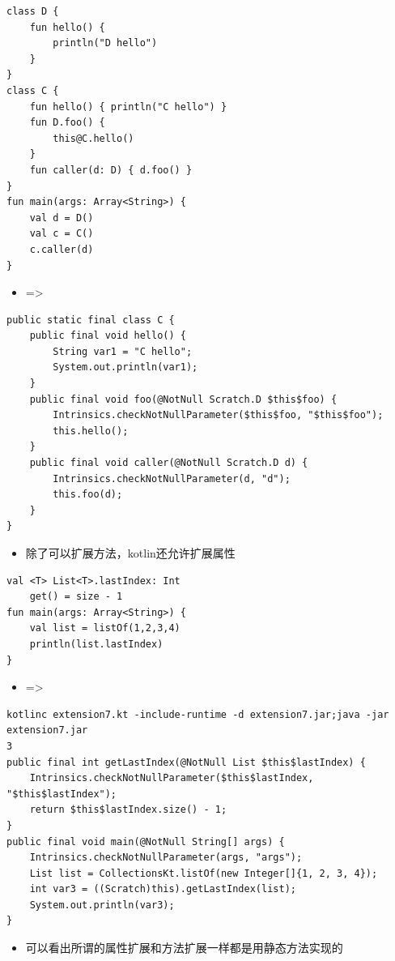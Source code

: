 \documentclass[9pt, b5paper]{article}
\begin{document}
\begin{verbatim}
class D {
    fun hello() {
        println("D hello")
    }
}
class C {
    fun hello() { println("C hello") }
    fun D.foo() {
        this@C.hello() 
    }
    fun caller(d: D) { d.foo() }
}
fun main(args: Array<String>) {
    val d = D()
    val c = C()
    c.caller(d)
}
\end{verbatim}
\begin{itemize}
\item =>
\end{itemize}
\begin{verbatim}
public static final class C {
    public final void hello() {
        String var1 = "C hello";
        System.out.println(var1);
    }
    public final void foo(@NotNull Scratch.D $this$foo) {
        Intrinsics.checkNotNullParameter($this$foo, "$this$foo");
        this.hello();
    }
    public final void caller(@NotNull Scratch.D d) {
        Intrinsics.checkNotNullParameter(d, "d");
        this.foo(d);
    }
}
\end{verbatim}
\begin{itemize}
\item 除了可以扩展方法，kotlin还允许扩展属性
\end{itemize}
\begin{verbatim}
val <T> List<T>.lastIndex: Int
    get() = size - 1
fun main(args: Array<String>) {
    val list = listOf(1,2,3,4)
    println(list.lastIndex)
}
\end{verbatim}
\begin{itemize}
\item =>
\end{itemize}
\begin{verbatim}
kotlinc extension7.kt -include-runtime -d extension7.jar;java -jar extension7.jar
3
public final int getLastIndex(@NotNull List $this$lastIndex) {
    Intrinsics.checkNotNullParameter($this$lastIndex, "$this$lastIndex");
    return $this$lastIndex.size() - 1;
}
public final void main(@NotNull String[] args) {
    Intrinsics.checkNotNullParameter(args, "args");
    List list = CollectionsKt.listOf(new Integer[]{1, 2, 3, 4});
    int var3 = ((Scratch)this).getLastIndex(list);
    System.out.println(var3);
}
\end{verbatim}
\begin{itemize}
\item 可以看出所谓的属性扩展和方法扩展一样都是用静态方法实现的
\end{itemize}
\end{document}
